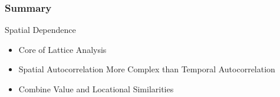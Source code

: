 \documentclass[nototal]{beamer}
\begin{document}
 \begin{frame}
   \frametitle{Summary}
   \begin{block}{Spatial Dependence}
     \begin{itemize}
       \item Core of Lattice Analysis
       \item Spatial Autocorrelation More Complex than Temporal
	 Autocorrelation
       \item Combine Value and Locational Similarities
     \end{itemize}
    \end{block}
  \end{frame}
\end{document}
